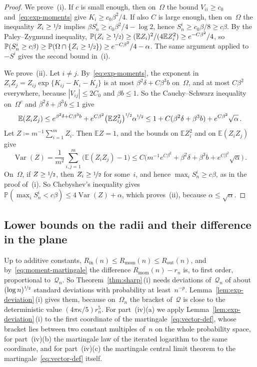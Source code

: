 \documentclass[11pt]{amsart}
\theoremstyle{plain}
\theoremstyle{definition}
\renewcommand{\P}{\mathbb P}
\newcommand{\E}{\mathbb E}
\newcommand{\Var}{\operatorname{Var}}
\newcommand{\drift}{\kappa}
\newcommand{\nf}{\nicefrac}
\newcommand{\Rin}{R_{\mathrm{in}}}
\newcommand{\Rout}{R_{\mathrm{out}}}
\newcommand{\Rmom}{R_{\mathrm{mom}}}
\numberwithin{equation}{section}
\begin{document}
\begin{proof}
We prove~(i). If $c$ is small enough, then on~$\Omega$ the bound $V_{ii}\geq c_0$ and~\eqref{eq:exp-moments} give $K_i\geq c_0\beta^2/4$. If also $C$ is large enough, then on~$\Omega$ the inequality $Z_i\geq\nf12$ implies $\beta S^i_n\geq c_0\beta^2/4-\log2$, hence $S^i_n\geq c_0\beta/8\geq c\beta$. By the Paley--Zygmund inequality, $\P(Z_i\geq\nf12)\geq(\E Z_i)^2/(4\E Z_i^2)\geq e^{-C\beta^2}/4$, so $\P(S^i_n\geq c\beta)\geq\P(\Omega\cap\{Z_i\geq\nf12\})\geq e^{-C\beta^2}/4-\alpha$. The same argument applied to~$-S^i$ gives the second bound in~(i).

We prove~(ii). Let $i\neq j$. By~\eqref{eq:exp-moments}, the exponent in $Z_iZ_j=Z_{ij}\exp\{K_{ij}-K_i-K_j\}$ is at most $\beta^2\delta+C\beta^3b$ on~$\Omega$, and at most $C\beta^2$ everywhere, because $|V_{ij}|\leq2C_0$ and $\beta b\leq1$. So the Cauchy--Schwarz inequality on~$\Omega^c$ and $\beta^2\delta+\beta^3b\leq1$ give
\begin{equation*}
\E(Z_iZ_j)\leq e^{\beta^2\delta+C\beta^3b}+e^{C\beta^2}\bigl(\E Z_{ij}^2\bigr)^{\nf12}\alpha^{\nf12}\leq1+C(\beta^2\delta+\beta^3b)+e^{C\beta^2}\sqrt\alpha\, .
\end{equation*}
Let $Z\coloneqq m^{-1}\sum_{i=1}^mZ_i$. Then $\E Z=1$, and the bounds on $\E Z_i^2$ and on $\E(Z_iZ_j)$ give
\begin{equation*}
\Var(Z)=\frac1{m^2}\sum_{i,j=1}^m\bigl(\E(Z_iZ_j)-1\bigr)\leq C\bigl(m^{-1}e^{C\beta^2}+\beta^2\delta+\beta^3b+e^{C\beta^2}\sqrt\alpha\bigr)\, .
\end{equation*}
On~$\Omega$, if $Z\geq\nf12$, then $Z_i\geq\nf12$ for some~$i$, and hence $\max_iS^i_n\geq c\beta$, as in the proof of~(i). So Chebyshev's inequality gives $\P(\max_iS^i_n<c\beta)\leq4\Var(Z)+\alpha$, which proves~(ii), because $\alpha\leq\sqrt\alpha$.
\end{proof}

\subsection{Lower bounds on the radii and their difference in the plane}

Up to additive constants, $\Rin(n)\leq\Rmom(n)\leq\Rout(n)$, and by~\eqref{eq:moment-martingale} the difference $\Rmom(n)-r_n$ is, to first order, proportional to~$\mathcal Q_n$. So Theorem~\ref{thm:sharp}\,(i) needs deviations of~$\mathcal Q_n$ of about $(\log n)^{\nf12}$ standard deviations with probability at least~$n^{-p}$. Lemma~\ref{lem:exp-deviation}\,(i) gives them, because on~$\Omega_n$ the bracket of~$\mathcal Q$ is close to the deterministic value $(4\pi\drift/5)r_n^5$. For part~(iv)(a) we apply Lemma~\ref{lem:exp-deviation}\,(i) to the first coordinate of the martingale~\eqref{eq:vector-def}, whose bracket lies between two constant multiples of~$n$ on the whole probability space, for part~(iv)(b) the martingale law of the iterated logarithm to the same coordinate, and for part~(iv)(c) the martingale central limit theorem to the martingale~\eqref{eq:vector-def} itself.
\end{document}
